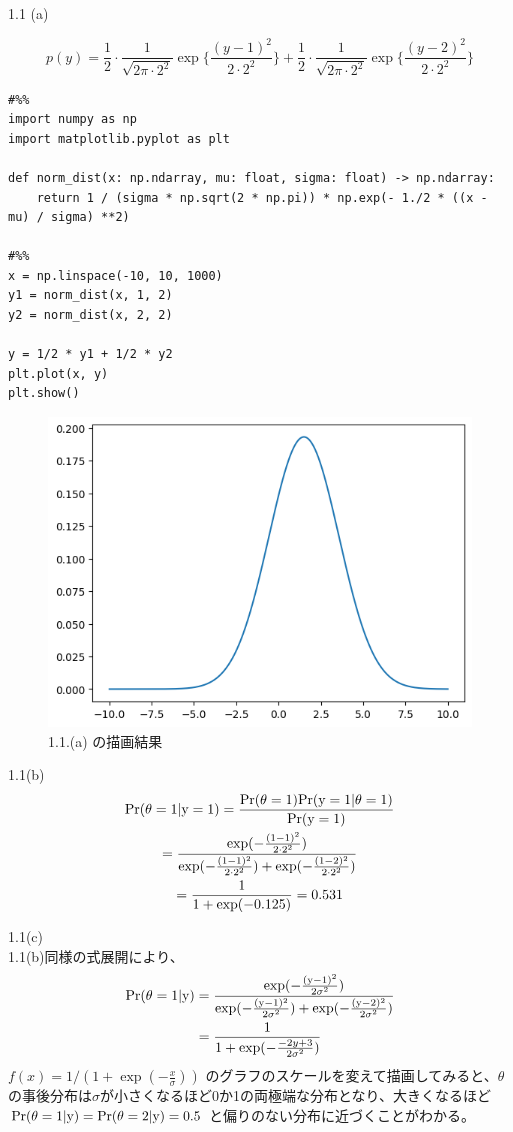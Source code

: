 \documentclass[pdflatex,ja=standard]{bxjsarticle}
\begin{document}
1.1 (a)

\begin{equation}
p(y) = \frac{1}{2} \cdot \frac{1}{\sqrt{2 \pi \cdot 2^2}} \exp{ \{ \frac{(y-1)^2}{2 \cdot 2^2} \}} + \frac{1}{2} \cdot \frac{1}{\sqrt{2 \pi \cdot 2^2}} \exp{ \{ \frac{(y-2)^2}{2 \cdot 2^2} \} }
\end{equation}

\begin{lstlisting}
#%%
import numpy as np
import matplotlib.pyplot as plt

def norm_dist(x: np.ndarray, mu: float, sigma: float) -> np.ndarray:
    return 1 / (sigma * np.sqrt(2 * np.pi)) * np.exp(- 1./2 * ((x - mu) / sigma) **2)

#%% 
x = np.linspace(-10, 10, 1000)
y1 = norm_dist(x, 1, 2)
y2 = norm_dist(x, 2, 2)

y = 1/2 * y1 + 1/2 * y2
plt.plot(x, y)
plt.show()

\end{lstlisting}

\begin{figure}
    \centering
    \includegraphics[width=0.5\linewidth]{norm_dist.png}
    \caption{1.1.(a) の描画結果}
    \label{fig:placeholder}
\end{figure}

1.1(b)
\begin{gather}
\rm{Pr} (\theta = 1 | y = 1) = \frac{Pr(\theta = 1) Pr(y=1 |\theta = 1) }{Pr(y=1)} \\
=  \frac{\exp(-\frac{(1-1)^2}{2 \cdot 2^2} ) }{\exp(-\frac{(1-1)^2}{2 \cdot 2^2}) + \exp(-\frac{(1-2)^2}{2 \cdot 2^2})} \\
= \frac{1}{1 + \exp(-0.125)} = 0.531
\end{gather}

1.1(c) \\
1.1(b)同様の式展開により、
\begin{gather}
\rm{Pr} (\theta = 1 | y) = \frac{\exp(-\frac{(y-1)^2}{2 \sigma^2} ) }{\exp(-\frac{(y-1)^2}{2 \sigma ^2}) + \exp(-\frac{(y-2)^2}{2 \sigma^2})} \\
= \frac{1}{1 + \exp(-\frac{-2y + 3}{2 \sigma^2})}
\end{gather}
$ f(x) = 1 / (1 +\exp(-\frac{x}{\sigma}))$ のグラフのスケールを変えて描画してみると、$\theta$の事後分布は$\sigma$が小さくなるほど0か1の両極端な分布となり、大きくなるほど $\rm{Pr} (\theta = 1|y) = \rm{Pr} (\theta = 2|y) = 0.5$ と偏りのない分布に近づくことがわかる。
\end{document}
